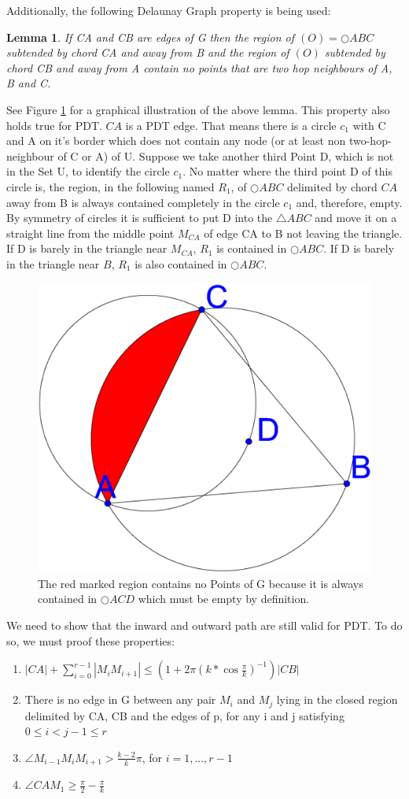 \documentclass[a4paper,twoside, onecolumn]{IEEEtran}
\newtheorem{emptyregion}{Lemma}[section]
\begin{document}
Additionally, the following Delaunay Graph property is being used:
\begin{emptyregion}
\label{emptyregion}
If CA and CB are edges of G then the region of $(O)=\bigcirc{ABC} $ subtended by chord  CA and away from B and the region of $(O) $ subtended by chord CB and away from A contain no points that are two hop neighbours of A, B and C.
\end{emptyregion}

See Figure \ref{fig:empty_region} for a graphical illustration of the above lemma.
This property also holds true for PDT.
$CA $ is a PDT edge. That means there is a circle $c_1 $ with C and A on it's border which does not contain any node (or at least non two-hop-neighbour of C or A) of U.
Suppose we take another third Point D, which is not in the Set U, to identify the circle $c_1 $.
No matter where the third point D of this circle is, the region, in the following named $R_1 $, of $\bigcirc{ABC} $ delimited by chord $CA $ away from B is always contained completely in the circle $c_1 $ and, therefore, empty.
By symmetry of circles it is sufficient to put D into the $\triangle{ABC} $ and move it on a straight line from the middle point $M_{CA} $ of edge CA to B not leaving the triangle.
If D is barely in the triangle near $M_{CA} $, $R_1 $ is contained in $\bigcirc{ABC} $.
If D is barely in the triangle near $B $, $R_1 $ is also contained in $\bigcirc{ABC} $. 


\begin{figure}[h!]
\centering
\includegraphics[width=0.2\linewidth]{noPointinRegion.eps}
\caption{The red marked region contains no Points of G because it is always contained in $\bigcirc{ACD} $ which must be empty by definition.}
\label{fig:empty_region}
\end{figure}


We need to show that the inward and outward path are still valid for PDT.
To do so, we must proof these properties:
\begin{enumerate}
\item $|CA| + \sum\nolimits_{i=0}^{r-1} |M_iM_{i+1}| \leq (1+2\pi (k*\cos{\frac{\pi}{k}})^{-1})|CB| $
\item There is no edge in G between any pair $M_i $ and $M_j $ lying in the closed region delimited by CA, CB and the edges of p, for any i and j satisfying $0 \leq i < j-1 \leq r $ 
\item $\angle{M_{i-1}M_iM_{i+1}} > \frac{k-2}{k}\pi $, for $i=1, ..., r-1 $ 
\item $\angle{CAM_1} \geq \frac{\pi}{2}-\frac{\pi}{k} $
\end{enumerate}
\end{document}
